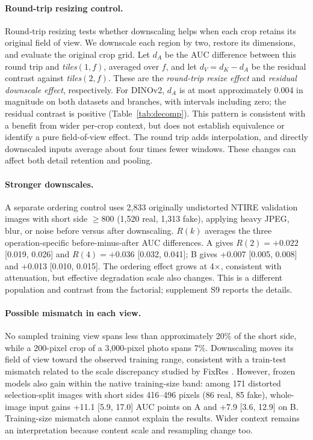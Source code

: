 \documentclass[letterpaper]{article} %
\begin{document}
\paragraph{Round-trip resizing control.} Round-trip resizing tests whether
downscaling helps when each crop retains its original field of view. We
downscale each region by two, restore its dimensions, and evaluate the
original crop grid. Let $d_A$ be the AUC difference between this round trip
and \emph{tiles}$(1,f)$, averaged over $f$, and let $d_V=d_K-d_A$ be the
residual contrast against \emph{tiles}$(2,f)$. These are the
\emph{round-trip resize effect} and \emph{residual downscale effect},
respectively. For DINOv2, $d_A$ is at most approximately 0.004 in magnitude on both
datasets and branches, with intervals including zero; the residual
contrast is positive (Table~\ref{tab:decomp}). This pattern is consistent
with a benefit from wider per-crop context, but does not establish
equivalence or identify a pure field-of-view effect. The round trip adds
interpolation, and directly downscaled inputs average about four times
fewer windows. These changes can affect both detail retention and pooling.

\paragraph{Stronger downscales.} A separate ordering control uses 2,833 originally undistorted NTIRE validation images with short side $\geq800$ (1,520 real, 1,313 fake), applying heavy JPEG, blur, or noise before versus after downscaling. $R(k)$ averages the three operation-specific before-minus-after AUC differences. A gives $R(2)=+0.022$ [0.019, 0.026] and $R(4)=+0.036$ [0.032, 0.041]; B gives +0.007 [0.005, 0.008] and +0.013 [0.010, 0.015]. The ordering effect grows at 4$\times$, consistent with attenuation, but effective degradation scale also changes. This is a different population and contrast from the factorial; supplement S9 reports the details.

\paragraph{Possible mismatch in each view.} No sampled training view spans
less than approximately 20\% of the short side, while a 200-pixel crop of a
3,000-pixel photo spans 7\%. Downscaling moves its field of view toward the
observed training range, consistent with a train-test mismatch related to
the scale discrepancy studied by FixRes \cite{touvron2019fixres}.
However, frozen models also gain within the native training-size band: among 171 distorted selection-split images with short sides 416--496 pixels (86 real, 85 fake), whole-image input gains +11.1 [5.9, 17.0] AUC points on A and +7.9 [3.6, 12.9] on B. Training-size mismatch alone cannot explain the results. Wider context remains an interpretation because content scale and resampling change too.
\end{document}
